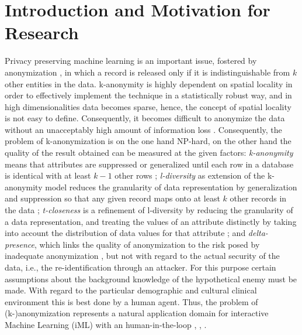 \documentclass{llncs}
\begin{document}
\renewcommand{\thesubfigure}{\thefigure.\arabic{subfigure}}
\makeatletter
\renewcommand{\p@subfigure}{}
\renewcommand{\@thesubfigure}{\thesubfigure:\hskip\subfiglabelskip}
\makeatother

\section{Introduction and Motivation for Research}

Privacy preserving machine learning is an important issue, fostered by anonymization \cite{Samarati:2001:kAnonymity}, in which a record is released only if it is indistinguishable from $k$ other entities in the data. k-anonymity is highly dependent on spatial locality in order to effectively implement the technique in a statistically robust way, and in high dimensionalities data becomes sparse, hence, the concept of spatial locality is not easy to define. Consequently, it becomes difficult to anonymize the data without an unacceptably high amount of information loss \cite{Aggarwal:2005:kAnonymity}. Consequently, the problem of k-anonymization is on the one hand NP-hard, on the other hand the quality of the result obtained can be measured at the given factors: \emph{k-anonymity} means that attributes are suppressed or generalized until each row in a database is identical with at least $k-1$ other rows   \cite{Sweeney:2002:k-Anonymity}; \emph{l-diversity} as extension of the k-anonymity model reduces the granularity of data representation by generalization and suppression so that any given record maps onto at least $k$ other records in the data \cite{MachanavajjhalaEtAl:2007:l-Diversity}; \emph{t-closeness} is a refinement of l-diversity by reducing the granularity of a data representation, and treating the values of an attribute distinctly by taking into account the distribution of data values for that attribute \cite{LiEtAl:2007:t-closeness}; and \emph{delta-presence}, which links the quality of anonymization to the risk posed by inadequate anonymization \cite{NergizClifton:2010:Delta-Presence}, but not with regard to the actual security of the data, i.e., the re-identification through an attacker. For this purpose certain assumptions about the background knowledge of the hypothetical enemy must be made. With regard to the particular demographic and cultural clinical environment this is best done by a human agent. Thus, the problem of (k-)anonymization represents a natural application domain for interactive Machine Learning (iML) with an human-in-the-loop \cite{Holzinger:2016:iML}, \cite{Kieseberg:2016:Doctor-in-the-Loop},  \cite{iMLExperiment}.
\end{document}
